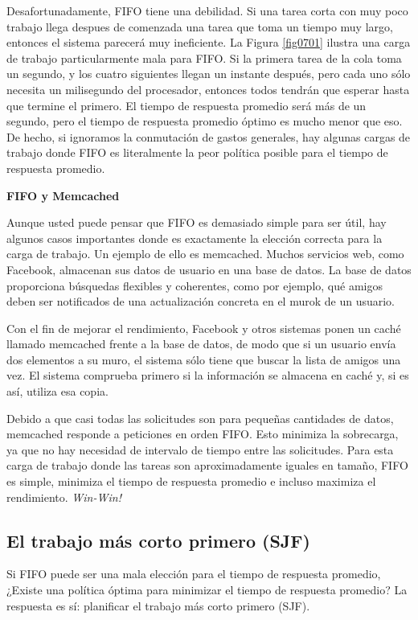 \documentclass[10pt]{book}
\begin{document}
Desafortunadamente, FIFO tiene una debilidad. Si una tarea corta con muy poco trabajo llega despues de comenzada una tarea que toma un tiempo muy largo, entonces el sistema parecerá muy ineficiente. La Figura \ref{fig0701} ilustra una carga de trabajo particularmente mala para FIFO. Si la primera tarea de la cola toma un segundo, y los cuatro siguientes llegan un instante después, pero cada uno sólo necesita un milisegundo del procesador, entonces todos tendrán que esperar hasta que termine el primero. El tiempo de respuesta promedio será más de un segundo, pero el tiempo de respuesta promedio óptimo es mucho menor que eso. De hecho, si ignoramos la conmutación de gastos generales, hay algunas cargas de trabajo donde FIFO es literalmente la peor política posible para el tiempo de respuesta promedio.

\textbf{FIFO y Memcached}

Aunque usted puede pensar que FIFO es demasiado simple para ser útil, hay algunos casos importantes donde es exactamente la elección correcta para la carga de trabajo. Un ejemplo de ello es memcached. Muchos servicios web, como Facebook, almacenan sus datos de usuario en una base de datos. La base de datos proporciona búsquedas flexibles y coherentes, como por ejemplo, qué amigos deben ser notificados de una actualización concreta en el murok de un usuario.

Con el fin de mejorar el rendimiento, Facebook y otros sistemas ponen un caché llamado memcached frente a la base de datos, de modo que si un usuario envía dos elementos a su muro, el sistema sólo tiene que buscar la lista de amigos una vez. El sistema comprueba primero si la información se almacena en caché y, si es así, utiliza esa copia.

Debido a que casi todas las solicitudes son para pequeñas cantidades de datos, memcached responde a peticiones en orden FIFO. Esto minimiza la sobrecarga, ya que no hay necesidad de intervalo de tiempo entre las solicitudes. Para esta carga de trabajo donde las tareas son aproximadamente iguales en tamaño, FIFO es simple, minimiza el tiempo de respuesta promedio e incluso maximiza el rendimiento. \textit{Win-Win!}

\subsection{El trabajo más corto primero (SJF)}
Si FIFO puede ser una mala elección para el tiempo de respuesta promedio, ¿Existe una política óptima para minimizar el tiempo de respuesta promedio? La respuesta es sí: planificar el trabajo más corto primero (SJF).
\end{document}
